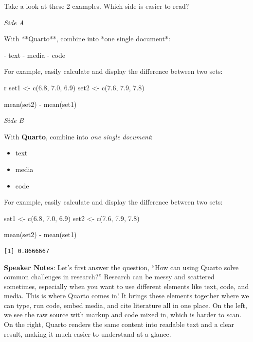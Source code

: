 \documentclass[
  letterpaper,
  DIV=11,
  numbers=noendperiod]{scrartcl}
\newenvironment{Shaded}{\begin{snugshade}}{\end{snugshade}}
\newcommand{\FloatTok}[1]{\textcolor[rgb]{0.68,0.00,0.00}{#1}}
\newcommand{\FunctionTok}[1]{\textcolor[rgb]{0.28,0.35,0.67}{#1}}
\newcommand{\NormalTok}[1]{\textcolor[rgb]{0.00,0.23,0.31}{#1}}
\newcommand{\OtherTok}[1]{\textcolor[rgb]{0.00,0.23,0.31}{#1}}
\newcommand{\SpecialCharTok}[1]{\textcolor[rgb]{0.37,0.37,0.37}{#1}}
\providecommand{\tightlist}{%
  \setlength{\itemsep}{0pt}\setlength{\parskip}{0pt}}
\begin{document}
Take a look at these 2 examples. Which side is easier to read?

\emph{Side A}

\begin{Shaded}
\begin{Highlighting}[]
\NormalTok{With **Quarto**, combine into *one single document*:}

\NormalTok{{-} text }
\NormalTok{{-} media}
\NormalTok{{-} code}

\NormalTok{For example, easily calculate and display the difference between two sets:}

\NormalTok{\textasciigrave{}\textasciigrave{}\textasciigrave{}r}
\NormalTok{set1 \textless{}{-} c(6.8, 7.0, 6.9)}
\NormalTok{set2 \textless{}{-} c(7.6, 7.9, 7.8)}

\NormalTok{mean(set2) {-} mean(set1)}
\NormalTok{\textasciigrave{}\textasciigrave{}\textasciigrave{}}
\end{Highlighting}
\end{Shaded}

\emph{Side B}

With \textbf{Quarto}, combine into \emph{one single document}:

\begin{itemize}
\tightlist
\item
  text
\item
  media
\item
  code
\end{itemize}

For example, easily calculate and display the difference between two
sets:

\begin{Shaded}
\begin{Highlighting}[]
\NormalTok{set1 }\OtherTok{\textless{}{-}} \FunctionTok{c}\NormalTok{(}\FloatTok{6.8}\NormalTok{, }\FloatTok{7.0}\NormalTok{, }\FloatTok{6.9}\NormalTok{)}
\NormalTok{set2 }\OtherTok{\textless{}{-}} \FunctionTok{c}\NormalTok{(}\FloatTok{7.6}\NormalTok{, }\FloatTok{7.9}\NormalTok{, }\FloatTok{7.8}\NormalTok{)}

\FunctionTok{mean}\NormalTok{(set2) }\SpecialCharTok{{-}} \FunctionTok{mean}\NormalTok{(set1)}
\end{Highlighting}
\end{Shaded}

\begin{verbatim}
[1] 0.8666667
\end{verbatim}

\textbf{Speaker Notes}: Let's first answer the question, ``How can using
Quarto solve common challenges in research?'' Research can be messy and
scattered sometimes, especially when you want to use different elements
like text, code, and media. This is where Quarto comes in! It brings
these elements together where we can type, run code, embed media, and
cite literature all in one place. On the left, we see the raw source
with markup and code mixed in, which is harder to scan. On the right,
Quarto renders the same content into readable text and a clear result,
making it much easier to understand at a glance.
\end{document}
